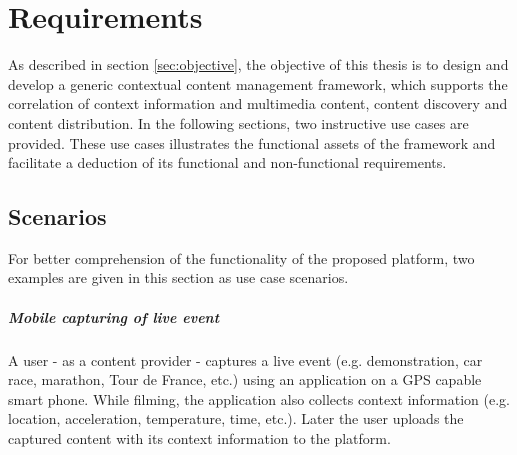 \chapter{Requirements\label{cha:chapter3}}
As described in section \ref{sec:objective}, the objective of this thesis is to design and develop a generic contextual content management framework, which supports the correlation of context information and multimedia content, content discovery and content distribution. In the following sections, two instructive use cases are provided. These use cases illustrates the functional assets of the framework and facilitate a deduction of its functional and non-functional requirements.
 
%
% 
 
\section{Scenarios\label{sec:req_sce}}

For better comprehension of the functionality of the proposed platform, two examples are given in this section as use case scenarios.

\paragraph{Mobile capturing of live event}

A user - as a content provider - captures a live event (e.g. demonstration, car race, marathon, Tour de France, etc.) using an application on a \ac{GPS} capable smart phone. While filming, the application also collects context information (e.g. location, acceleration, temperature, time, etc.). Later the user uploads the captured content with its context information to the platform.

